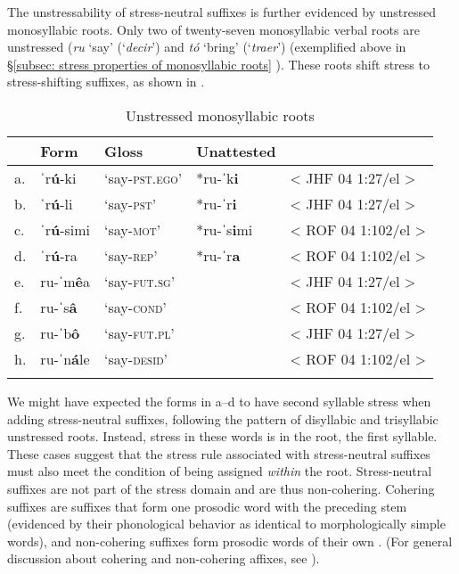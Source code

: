 The unstressability of stress-neutral suffixes is further evidenced by unstressed monosyllabic roots. Only two of twenty-seven monosyllabic verbal roots are unstressed (\textit{ru} ‘say’ (‘\textit{decir}’) and \textit{tó} ‘bring’ (‘\textit{traer}’) (exemplified above in §\ref{subsec: stress properties of monosyllabic roots} ). These roots shift stress to stress-shifting suffixes, as shown in .

\begin{table}
\caption{Unstressed monosyllabic roots}
\label{tab:unstressed-monosyllabic}

\begin{tabularx}{\textwidth}{lXXXl}
\lsptoprule
&\textbf{Form} & \textbf{Gloss} & \textbf{Unattested} &  \\
\midrule
a.& ˈr\textbf{ú}{}-ki   & ‘say-\textsc{pst.ego}’   &  *ru-ˈk\textbf{i}   &  < JHF 04 1:27/el >\\
b.& ˈr\textbf{ú}{}-li   &  ‘say-\textsc{pst}’ &   *ru-ˈr\textbf{i} & < JHF 04 1:27/el >\\
c.& ˈr\textbf{ú}{}-simi  &  ‘say-\textsc{mot}’  & *ru-ˈs\textbf{i}mi  & < ROF 04 1:102/el >\\
d.& ˈr\textbf{ú}{}-ra     & ‘say-\textsc{rep}’ &  *ru-ˈr\textbf{a} & < ROF 04 1:102/el >\\
e.& ru-ˈm\textbf{ê}a   & ‘say-\textsc{fut.sg}’  &    & < JHF 04 1:27/el >\\
f.& ru-ˈs\textbf{â}   & ‘say-\textsc{cond}’  & &< ROF 04 1:102/el >\\
g.& ru-ˈb\textbf{ô}   & ‘say-\textsc{fut.pl}’    &  & < JHF 04 1:27/el >\\
h.& ru-ˈn\textbf{á}le   & ‘say-\textsc{desid}’  &    & < ROF 04 1:102/el >\\
\lspbottomrule
\end{tabularx}
\end{table}

We might have expected the forms in a--d to have second syllable stress when adding stress-neutral suffixes, following the pattern of disyllabic and trisyllabic unstressed roots. Instead, stress in these words is in the root, the first syllable. These cases suggest that the stress rule associated with stress-neutral suffixes must also meet the condition of being assigned \textit{within} the root. Stress-neutral suffixes are not part of the stress domain and are thus non-cohering. Cohering suffixes are suffixes that form one prosodic word with the preceding stem (evidenced by their phonological behavior as identical to morphologically simple words), and non-cohering suffixes form prosodic words of their own \parencite{booij2002prosodic}. (For general discussion about cohering and non-cohering affixes, see \citealt{dixon1977some, booij1977dutch, booij1999phonology, booij2002prosodic}).

